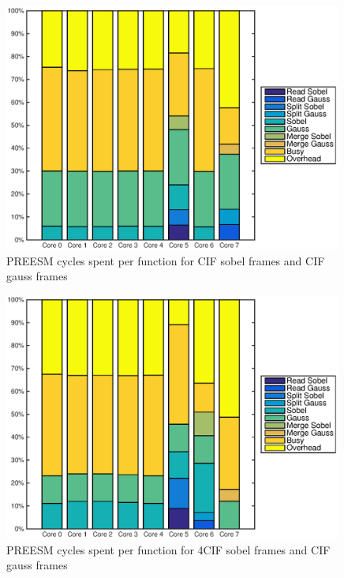 \begin{figure}[h!]
    \begin{center}
        \includegraphics[width=0.99\textwidth]{images/preesm_cifcif.eps}
        \caption{PREESM cycles spent per function for CIF sobel frames and CIF gauss frames}
        \label{fig:preesmcif}
    \end{center}
\end{figure}

\begin{figure}[h!]
    \begin{center}
        \includegraphics[width=0.99\textwidth]{images/preesm_sobel4cif_gausscif.eps}
        \caption{PREESM cycles spent per function for 4CIF sobel frames and CIF gauss frames}
        \label{fig:preesmsobel4cif}
    \end{center}
\end{figure}

